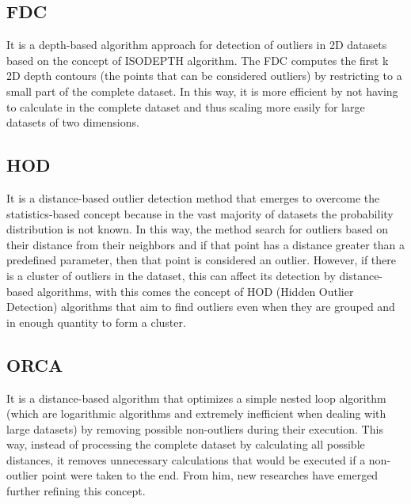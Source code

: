

\subsection{FDC}

It is a depth-based algorithm approach for detection of outliers in 2D datasets based on
the concept of ISODEPTH algorithm. The FDC computes the first k 2D depth contours (the
points that can be considered outliers) by restricting to a small part of the complete
dataset. In this way, it is more efficient by not having to calculate in the complete
dataset and thus scaling more easily for large datasets of two dimensions.

\subsection{HOD}

It is a distance-based outlier detection method that emerges to overcome the statistics-based
concept because in the vast majority of datasets the probability distribution is not known.
In this way, the method search for outliers based on their distance from their neighbors
and if that point has a distance greater than a predefined parameter, then that point is
considered an outlier. However, if there is a cluster of outliers in the dataset, this
can affect its detection by distance-based algorithms, with this comes the concept of HOD
(Hidden Outlier Detection) algorithms that aim to find outliers even when they are grouped
and in enough quantity to form a cluster.



\subsection{ORCA}

It is a distance-based algorithm that optimizes a simple nested loop algorithm (which are
logarithmic algorithms and extremely inefficient when dealing with large datasets) by
removing possible non-outliers during their execution. This way, instead of processing
the complete dataset by calculating all possible distances, it removes unnecessary
calculations that would be executed if a non-outlier point were taken to the end. From him,
new researches have emerged further refining this concept.

